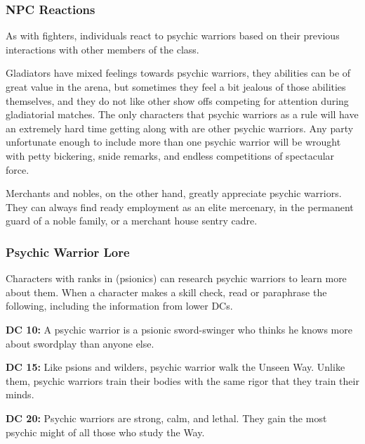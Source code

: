 \subsubsection{NPC Reactions}

As with fighters, individuals react to psychic warriors based on their previous interactions with other members of the class.

Gladiators have mixed feelings towards psychic warriors, they abilities can be of great value in the arena, but sometimes they feel a bit jealous of those abilities themselves, and they do not like other show offs competing for attention during gladiatorial matches. The only characters that psychic warriors as a rule will have an extremely hard time getting along with are other psychic warriors. Any party unfortunate enough to include more than one psychic warrior will be wrought with petty bickering, snide remarks, and endless competitions of spectacular force.

Merchants and nobles, on the other hand, greatly appreciate psychic warriors. They can always find ready employment as an elite mercenary, in the permanent guard of a noble family, or a merchant house sentry cadre.

\subsubsection{Psychic Warrior Lore}

Characters with ranks in  (psionics) can research psychic warriors to learn more about them. When a character makes a skill check, read or paraphrase the following, including the information from lower DCs.

\textbf{DC 10:} A psychic warrior is a psionic sword-swinger who thinks he knows more about swordplay than anyone else.

\textbf{DC 15:} Like psions and wilders, psychic warrior walk the Unseen Way. Unlike them, psychic warriors train their bodies with the same rigor that they train their minds.

\textbf{DC 20:} Psychic warriors are strong, calm, and lethal. They gain the most psychic might of all those who study the Way.
